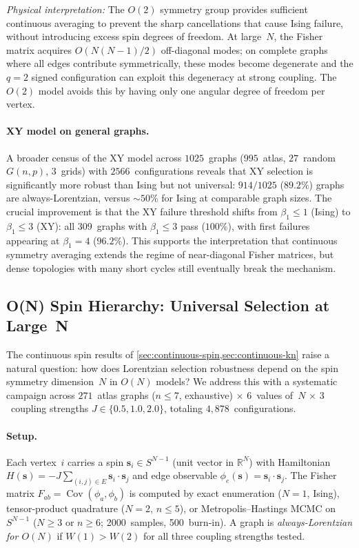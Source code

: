 \documentclass[11pt]{article}
\theoremstyle{definition}
\theoremstyle{remark}
\begin{document}
\noindent\emph{Physical interpretation:} The $O(2)$ symmetry group provides
sufficient continuous averaging to prevent the sharp cancellations that cause
Ising failure, without introducing excess spin degrees of freedom.
At large~$N$, the Fisher matrix acquires $O(N(N{-}1)/2)$ off-diagonal modes;
on complete graphs where all edges contribute symmetrically, these modes
become degenerate and the $q = 2$ signed configuration can exploit this
degeneracy at strong coupling.  The $O(2)$ model avoids this by having only
one angular degree of freedom per vertex.

\paragraph{XY model on general graphs.}
A broader census of the XY model across $1025$~graphs ($995$~atlas, $27$~random
$G(n,p)$, $3$~grids) with $2566$~configurations reveals that XY selection is
significantly more robust than Ising but not universal: $914/1025$ ($89.2\%$)
graphs are always-Lorentzian, versus $\sim 50\%$ for Ising at comparable graph
sizes. The crucial improvement is that the XY failure threshold shifts from
$\beta_1 \leq 1$ (Ising) to $\beta_1 \leq 3$ (XY): all $309$~graphs with
$\beta_1 \leq 3$ pass ($100\%$), with first failures appearing at $\beta_1 = 4$
($96.2\%$). This supports the interpretation that continuous symmetry averaging
extends the regime of near-diagonal Fisher matrices, but dense topologies with
many short cycles still eventually break the mechanism.

\subsection{O(N) Spin Hierarchy: Universal Selection at Large~N}
\label{sec:on-hierarchy}

The continuous spin results of \cref{sec:continuous-spin,sec:continuous-kn}
raise a natural question: how does Lorentzian selection robustness depend on the
spin symmetry dimension~$N$ in $O(N)$ models? We address this with a systematic
campaign across $271$~atlas graphs ($n \leq 7$, exhaustive) $\times$ $6$~values of~$N$
$\times$ $3$~coupling strengths $J \in \{0.5, 1.0, 2.0\}$, totaling $4{,}878$~configurations.

\paragraph{Setup.}
Each vertex~$i$ carries a spin $\mathbf{s}_i \in S^{N-1}$ (unit vector in $\mathbb{R}^N$)
with Hamiltonian $H(\mathbf{s}) = -J \sum_{(i,j) \in E} \mathbf{s}_i \cdot \mathbf{s}_j$
and edge observable $\phi_e(\mathbf{s}) = \mathbf{s}_i \cdot \mathbf{s}_j$.
The Fisher matrix $F_{ab} = \operatorname{Cov}(\phi_a, \phi_b)$ is computed by
exact enumeration ($N = 1$, Ising), tensor-product quadrature ($N = 2$, $n \leq 5$),
or Metropolis--Hastings MCMC on $S^{N-1}$ ($N \geq 3$ or $n \geq 6$;
2000~samples, 500~burn-in). A graph is \emph{always-Lorentzian for $O(N)$} if
$W(1) > W(2)$ for all three coupling strengths tested.
\end{document}
